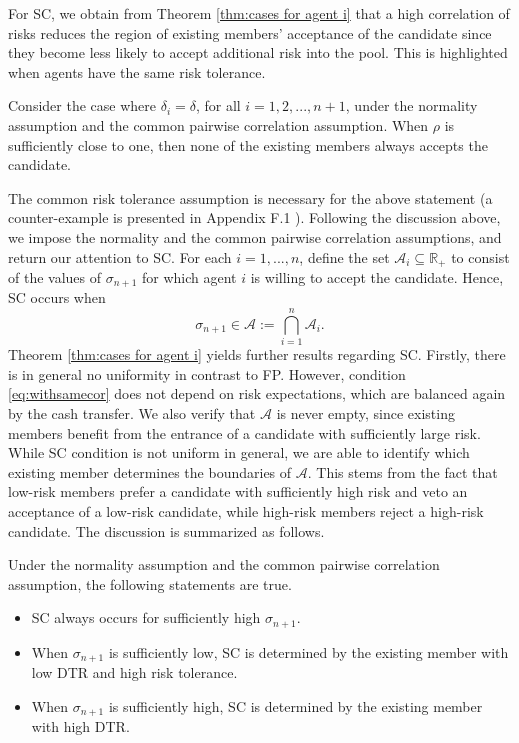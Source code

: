 \documentclass[fleqn,mnsc,nonblindrev]{informs4}
\begin{document}
  {For SC}, we obtain from Theorem \ref{thm:cases for agent i} that a high correlation of risks reduces the region of existing members' acceptance of the candidate since they become less likely to accept additional risk into the pool. This is highlighted when agents have the same risk tolerance.
\begin{corollary}\label{cor:equistrong_prop4}
Consider the case where $\delta_i=\delta$, for all $i=1,2,...,n+1$, under the normality assumption and the common pairwise correlation assumption. When $\rho$ is sufficiently close to one, then none of the existing members always accepts the candidate.
\end{corollary}  
  {The common risk tolerance assumption} is necessary for the above statement   {(a counter-example is presented in Appendix F.1%
).} Following the discussion above, we impose the normality and the common pairwise correlation assumptions, and return our attention to SC. For each $i=1,...,n$, define the set $\mathcal{A}_i \subseteq \mathbb{R}_+ $ to consist of the values of $\sigma_{n+1}$ for which agent $i$ is willing to accept the candidate. Hence, SC occurs when 
\begin{equation}\label{eq:strong_consensus_equilibrium}
\sigma_{n+1}\in \mathcal{A}:=\bigcap_{i=1}^n\mathcal{A}_i.    
\end{equation}
Theorem \ref{thm:cases for agent i} yields further results regarding SC. Firstly, there is in general no uniformity in contrast to FP. However, condition \eqref{eq:withsamecor} does not depend on risk expectations, which are balanced again by the cash transfer. We also verify that $\mathcal{A}$ is never empty, since existing members benefit from the entrance of a candidate with sufficiently large risk. While SC condition is not uniform in general, we are able to identify which existing member determines the boundaries of $\mathcal{A}$. This stems from the fact that low-risk members prefer a candidate with sufficiently high risk and veto an acceptance of a low-risk candidate, while high-risk members reject a high-risk candidate. The discussion   {is} summarized as follows.
\begin{theorem}\label{thm:strong consensus equilibrium 1}
Under the normality assumption and the common pairwise correlation assumption, the following statements are true.
\begin{itemize}
\item [i.] SC always occurs for sufficiently high $\sigma_{n+1}$.
\item[ii.] When $\sigma_{n+1}$ is sufficiently low, SC is determined by the existing member with low DTR and high risk tolerance.
\item[iii.] When $\sigma_{n+1}$ is sufficiently high, SC is determined by the existing member with high DTR.
\end{itemize}
\end{theorem}
\end{document}
